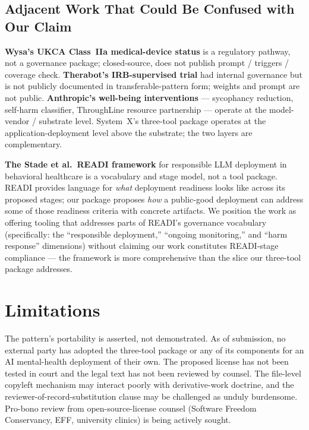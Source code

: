 \documentclass[letterpaper]{article} %
\begin{document}
\subsection{Adjacent Work That Could Be Confused with Our Claim}

\noindent\textbf{Wysa's UKCA Class~IIa medical-device status} \citep{habicht2024limbic} is a regulatory pathway, not a governance package; closed-source, does not publish prompt / triggers / coverage check. \textbf{Therabot's IRB-supervised trial} \citep{heinz2025therabot} had internal governance but is not publicly documented in transferable-pattern form; weights and prompt are not public. \textbf{Anthropic's well-being interventions} \citep{anthropic2025wellbeing} --- sycophancy reduction, self-harm classifier, ThroughLine resource partnership --- operate at the model-vendor / substrate level. System~X's three-tool package operates at the application-deployment level above the substrate; the two layers are complementary.

\noindent\textbf{The Stade et al.\ READI framework} \citep{stade2024readi} for responsible LLM deployment in behavioral healthcare is a vocabulary and stage model, not a tool package. READI provides language for \emph{what} deployment readiness looks like across its proposed stages; our package proposes \emph{how} a public-good deployment can address some of those readiness criteria with concrete artifacts. We position the work as offering tooling that addresses parts of READI's governance vocabulary (specifically: the ``responsible deployment,'' ``ongoing monitoring,'' and ``harm response'' dimensions) without claiming our work constitutes READI-stage compliance --- the framework is more comprehensive than the slice our three-tool package addresses.

\section{Limitations}
\label{sec:limitations}

The pattern's portability is asserted, not demonstrated. As of submission, no external party has adopted the three-tool package or any of its components for an AI mental-health deployment of their own. The proposed license has not been tested in court and the legal text has not been reviewed by counsel. The file-level copyleft mechanism may interact poorly with derivative-work doctrine, and the reviewer-of-record-substitution clause may be challenged as unduly burdensome. Pro-bono review from open-source-license counsel (Software Freedom Conservancy, EFF, university clinics) is being actively sought.
\end{document}
